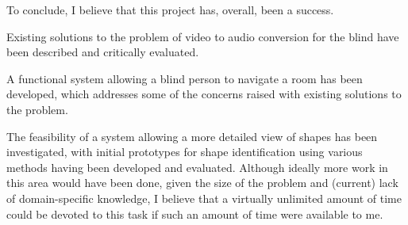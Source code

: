 To conclude, I believe that this project has, overall, been a success.

Existing solutions to the problem of video to audio conversion for the blind have been described and critically evaluated.

A functional system allowing a blind person to navigate a room has been developed, which addresses some of the concerns raised with existing solutions to the problem.

The feasibility of a system allowing a more detailed view of shapes has been investigated, with initial prototypes for shape identification using various methods having been developed and evaluated. Although ideally more work in this area would have been done, given the size of the problem and (current) lack of domain-specific knowledge, I believe that a virtually unlimited amount of time could be devoted to this task if such an amount of time were available to me.
